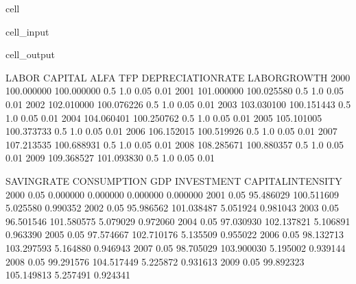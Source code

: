 \documentclass[letterpaper,10pt,english]{jupyterBook}
\begin{document}
\begin{sphinxuseclass}{cell}\begin{sphinxVerbatimInput}

\begin{sphinxuseclass}{cell_input}
\begin{sphinxVerbatim}[commandchars=\\\{\}]
   

\end{sphinxVerbatim}

\end{sphinxuseclass}\end{sphinxVerbatimInput}
\begin{sphinxVerbatimOutput}

\begin{sphinxuseclass}{cell_output}
\begin{sphinxVerbatim}[commandchars=\\\{\}]
           LABOR     CAPITAL  ALFA  TFP  DEPRECIATION\PYGZus{}RATE  LABOR\PYGZus{}GROWTH  \PYGZbs{}
2000  100.000000  100.000000   0.5  1.0               0.05          0.01   
2001  101.000000  100.025580   0.5  1.0               0.05          0.01   
2002  102.010000  100.076226   0.5  1.0               0.05          0.01   
2003  103.030100  100.151443   0.5  1.0               0.05          0.01   
2004  104.060401  100.250762   0.5  1.0               0.05          0.01   
2005  105.101005  100.373733   0.5  1.0               0.05          0.01   
2006  106.152015  100.519926   0.5  1.0               0.05          0.01   
2007  107.213535  100.688931   0.5  1.0               0.05          0.01   
2008  108.285671  100.880357   0.5  1.0               0.05          0.01   
2009  109.368527  101.093830   0.5  1.0               0.05          0.01   

      SAVING\PYGZus{}RATE  CONSUMPTION         GDP  INVESTMENT  CAPITAL\PYGZus{}INTENSITY  
2000         0.05     0.000000    0.000000    0.000000           0.000000  
2001         0.05    95.486029  100.511609    5.025580           0.990352  
2002         0.05    95.986562  101.038487    5.051924           0.981043  
2003         0.05    96.501546  101.580575    5.079029           0.972060  
2004         0.05    97.030930  102.137821    5.106891           0.963390  
2005         0.05    97.574667  102.710176    5.135509           0.955022  
2006         0.05    98.132713  103.297593    5.164880           0.946943  
2007         0.05    98.705029  103.900030    5.195002           0.939144  
2008         0.05    99.291576  104.517449    5.225872           0.931613  
2009         0.05    99.892323  105.149813    5.257491           0.924341  
\end{sphinxVerbatim}

\end{sphinxuseclass}\end{sphinxVerbatimOutput}

\end{sphinxuseclass}
\end{document}
